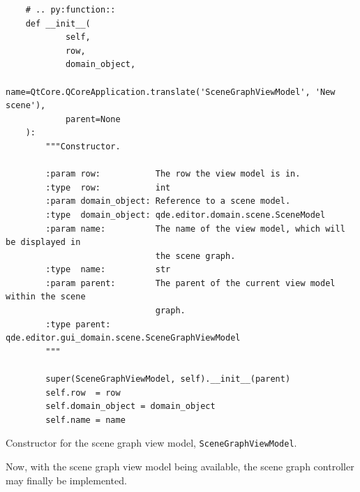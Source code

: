 \documentclass[10pt, openright, notitlepage]{scrreprt}
\begin{document}
\begin{listing}[H]
\begin{verbatim}
    # .. py:function::
    def __init__(
            self,
            row,
            domain_object,
            name=QtCore.QCoreApplication.translate('SceneGraphViewModel', 'New scene'),
            parent=None
    ):
        """Constructor.
    
        :param row:           The row the view model is in.
        :type  row:           int
        :param domain_object: Reference to a scene model.
        :type  domain_object: qde.editor.domain.scene.SceneModel
        :param name:          The name of the view model, which will be displayed in
                              the scene graph.
        :type  name:          str
        :param parent:        The parent of the current view model within the scene
                              graph.
        :type parent:         qde.editor.gui_domain.scene.SceneGraphViewModel
        """
    
        super(SceneGraphViewModel, self).__init__(parent)
        self.row  = row
        self.domain_object = domain_object
        self.name = name
\end{verbatim}
\caption{\label{guidomain-scene-scenegraphviewmodel-constructor}
Constructor for the scene graph view model, \texttt{SceneGraphViewModel}.}
\end{listing}

Now, with the scene graph view model being available, the scene graph controller
may finally be implemented.
\end{document}
